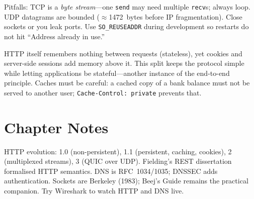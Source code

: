 Pitfalls: TCP is a \emph{byte stream}---one \texttt{send} may need multiple \texttt{recv}s; always loop. UDP datagrams are bounded ($\approx$1472~bytes before IP fragmentation). Close sockets or you leak ports. Use \texttt{SO\_REUSEADDR} during development so restarts do not hit ``Address already in use.''

\begin{remark}
HTTP itself remembers nothing between requests (stateless), yet cookies and server-side sessions add memory above it. This split keeps the protocol simple while letting applications be stateful---another instance of the end-to-end principle. Caches must be careful: a cached copy of a bank balance must not be served to another user; \texttt{Cache-Control: private} prevents that.
\end{remark}

\section{Chapter Notes}
HTTP evolution: 1.0 (non-persistent), 1.1 (persistent, caching, cookies), 2 (multiplexed streams), 3 (QUIC over UDP). Fielding's REST dissertation formalised HTTP semantics. DNS is RFC~1034/1035; DNSSEC adds authentication. Sockets are Berkeley (1983); Beej's Guide remains the practical companion. Try Wireshark to watch HTTP and DNS live.

